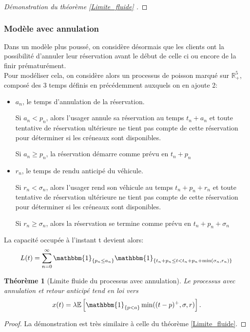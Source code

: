 \documentclass[12pt,a4paper]{article}
\newcommand{\E}[1]{\mathbb{E}\left[ #1 \right]}
\newcommand{\R}{\mathbb{R}}
\newcommand{\1}[1]{\mathbbm{1}_{\{#1\}} }
\newtheorem{theorem}{Théorème}
\theoremstyle{definition}
\begin{document}
{\begin{proof}[Démonstration du théorème \ref{Limite_fluide} ]
\end{proof}

\subsubsection{Modèle avec annulation}

Dans un modèle plus poussé, on considère désormais que les clients ont la possibilité d'annuler leur réservation avant le début de celle ci ou encore de la finir prématurément.\\

Pour modéliser cela, on considère alors un processus de poisson marqué sur $\R_+^5$, composé des 3 temps définis en précédemment auxquels on en ajoute 2:
\begin{itemize}
\item $a_n$, le temps d'annulation de la réservation.

Si $a_n < p_n$, alors l'usager annule sa réservation au temps $t_n+a_n$ et toute tentative de réservation ultérieure  ne tient pas compte de cette réservation pour déterminer si les créneaux sont disponibles.

Si $a_n \geq p_n$, la réservation démarre comme prévu en $t_n + p_n$

\item $r_n$, le temps de rendu anticipé du véhicule.

Si $r_n < \sigma_n$, alors l'usager rend son véhicule au temps $t_n+p_n+r_n$ et toute tentative de réservation ultérieure  ne tient pas compte de cette réservation pour déterminer si les créneaux sont disponibles.

Si $r_n \geq \sigma_n$, alors la réservation se termine comme prévu en $t_n+p_n+\sigma_n$\\
\end{itemize} 

La capacité occupée à l'instant t devient alors:
$$L(t) = \sum_{n=0}^{\infty} \1{p_n\leq a_n}\mathbbm{1}_{\{t_n+p_n \leq t < t_n + p_n +\min(\sigma_n,r_n)\}}$$

\begin{theorem}[Limite fluide du processus avec annulation]
\label{Limite_fluide_anul}
Le processus avec annulation et retour anticipé tend en loi vers $$x(t) = \lambda\E{\1{p<a}\min((t-p)^+,\sigma,r)}.$$

\end{theorem}

\begin{proof}

La démonstration est très similaire à celle du théorème \ref{Limite_fluide}.



\end{proof}}
\end{document}

